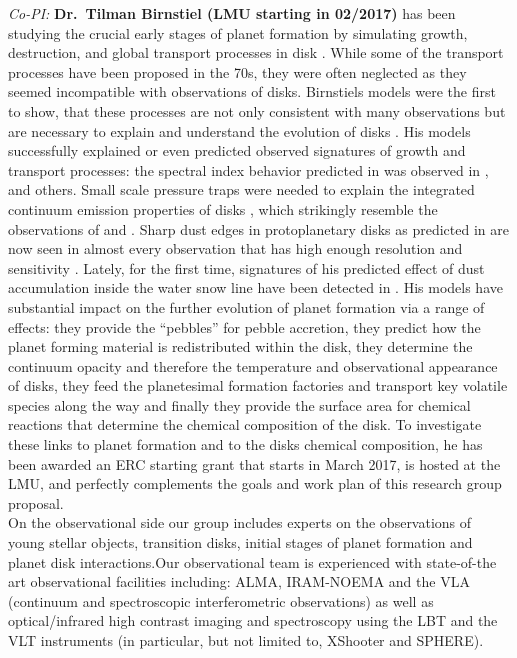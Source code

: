 \documentclass[10pt,fleqn,twoside]{article}
\begin{document}
\textit{Co-PI:} \textbf{Dr.\ Tilman Birnstiel (LMU starting in 02/2017)} has been
studying the crucial early stages of planet formation by simulating growth,
destruction, and global transport processes in disk
\citep[e.g.][]{2010A&A...513A..79B}. While some of the transport processes have
been proposed in the 70s, they were often neglected as they seemed incompatible
with observations of disks. Birnstiels models were the first to show, that these
processes are not only consistent with many observations but are necessary to
explain and understand the evolution of disks \citep{2010A&A...516L..14B}. His
models successfully explained or even predicted observed signatures of growth
and transport processes: the spectral index behavior predicted in
\citet{2010A&A...516L..14B} was observed in \citet{2012ApJ...760L..17P},
\citet{2016A&A...588A..53T} and others. Small scale pressure traps were needed
to explain the integrated continuum emission properties of disks
\citep{2012A&A...538A.114P}, which strikingly resemble the observations of
\citet{2015ApJ...808L...3A} and \citet{2016ApJ...820L..40A}. Sharp dust edges in
protoplanetary disks as predicted in \citet{2014ApJ...780..153B} are now seen in
almost every observation that has high enough resolution and sensitivity
\citep[e.g.][]{2016ApJ...820L..40A,2013A&A...557A.133D}. Lately, for the first
time, signatures of his predicted effect of dust accumulation inside the water
snow line \citet{2010A&A...513A..79B} have been detected in
\citet{2016Natur.535..258C}. His models have substantial impact on the further
evolution of planet formation via a range of effects: they provide the
``pebbles'' for pebble accretion, they predict how the planet forming material
is redistributed within the disk, they determine the continuum opacity and
therefore the temperature and observational appearance of disks, they feed the
planetesimal formation factories and transport key volatile species along the
way and finally they provide the surface area for chemical reactions that determine the
chemical composition of the disk. To investigate these links to planet formation
and to the disks chemical composition, he has been awarded an ERC starting grant
that starts in March 2017, is hosted at the LMU, and perfectly complements
the goals and work plan of this research group proposal.\\

 On the observational side our group includes experts on the
 observations of young stellar objects, transition disks, initial stages of
 planet formation and planet disk interactions.Our observational team
 is experienced with state-of-the art observational facilities
 including: ALMA, IRAM-NOEMA and the VLA (continuum and spectroscopic
 interferometric observations) as well as optical/infrared high
 contrast imaging and spectroscopy using the LBT and the VLT
 instruments (in particular, but not limited to, XShooter and
 SPHERE).\\ 
\end{document}

